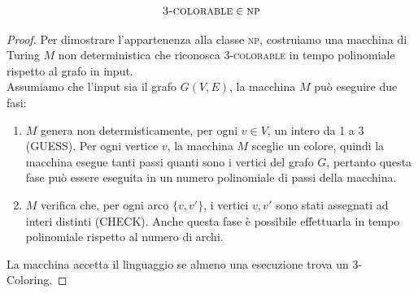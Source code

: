 \[     \textsc{3-colorable} \in \textsc{np}  \]
\begin{proof}
    Per dimostrare l'appartenenza alla classe \textsc{np}, costruiamo una macchina di Turing $M $ non deterministica che riconosca \textsc{3-colorable} in tempo polinomiale rispetto al grafo in input.\smallskip\\
    Assumiamo che l'input sia il grafo $G(V,E)$, la macchina $M$ può eseguire due fasi:
    \begin{enumerate}
        \item $M$ genera non determisticamente, per ogni $v \in V$, un intero da 1 a 3 (GUESS). Per ogni vertice $v$, la macchina $M$ sceglie un colore, quindi la macchina esegue tanti passi quanti sono i vertici del 
        grafo $G$, pertanto questa fase può essere eseguita in un numero polinomiale di passi della macchina.

        \item $M$ verifica che, per ogni arco $\{  v, v' \}$, i vertici $v,v'$ sono stati assegnati ad interi distinti (CHECK). Anche questa fase è possibile effettuarla in tempo polinomiale rispetto al numero di archi.
    \end{enumerate}


    \noindent La macchina accetta il linguaggio se almeno una esecuzione trova un 3-Coloring.
\end{proof} 





